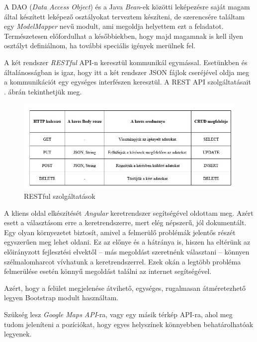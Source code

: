 A DAO (\textit{Data Access Object}) és a Java \textit{Bean}-ek közötti leképezésre saját magam által készített leképező osztályokat terveztem készíteni, de szerencsére találtam egy \textit{ModelMapper} nevű modult, ami megoldja helyettem ezt a feladatot. Természetesen előfordulhat a későbbiekben, hogy majd magamnak is kell ilyen osztályt definiálnom, ha további speciális igények merülnek fel.


A két rendszer \textit{RESTful} API-n keresztül kommunikál egymással. Esetünkben és általánosságban is igaz, hogy itt a két rendszer JSON fájlok cseréjével oldja meg a kommunikációt egy egységes interfészen keresztül.
A REST API szolgáltatásait . ábrán tekinthetjük meg.

\begin{figure}
\centering
\includegraphics[scale=0.75]{kepek/rest.jpg}
\caption{RESTful szolgáltatások}
\label{fig:rest}
\end{figure}


A kliens oldal elkészítését \textit{Angular} keretrendszer segítségével oldottam meg. Azért esett a választásom erre a keretrendszerre, mert elég népszerű, jól dokumentált. Egy olyan környezetet biztosít, amivel a felmerülő problémák jelentős részét egyszerűen meg lehet oldani. Ez az előnye és a hátránya is, hiszen ha eltérünk az előirányzott fejlesztési elvektől -- más megoldást szeretnénk választani -- könnyen szélmalomharcot vívhatunk a keretrendszerrel. Ezek okán a legtöbb probléma felmerülése esetén könnyű megoldást találni az internet segítségével.

Azért, hogy a felület megjelenése átvihető, egységes, rugalmasan átméretezhető legyen Bootstrap modult használtam.

Szükség lesz \textit{Google Maps API}-ra, vagy egy másik térkép API-ra, ahol meg tudom jeleníteni a pozíciókat, hogy egyes helyszínek könnyebben behatárolhatóak legyenek.

